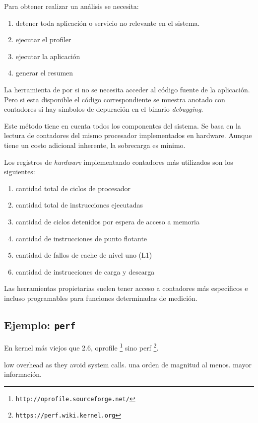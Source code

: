 \documentclass[a4paper]{report}
\begin{document}
Para obtener realizar un análisis se necesita:

\begin{enumerate}
\item detener toda aplicación o servicio no relevante en el sistema.
\item ejecutar el profiler
\item ejecutar la aplicación
\item generar el resumen
\end{enumerate}

La herramienta de por si no se necesita acceder al código fuente de la aplicación.
Pero si esta disponible el código correspondiente se muestra anotado con contadores
si hay símbolos de depuración en el binario {\it debugging}.

Este método tiene en cuenta todos los componentes del sistema.
Se basa en la lectura de contadores del mismo procesador implementados en hardware.
Aunque tiene un costo adicional inherente, la sobrecarga es mínimo.

Los registros de {\it hardware} implementando contadores más utilizados son los
siguientes:

\begin{enumerate}
\item cantidad total de ciclos de procesador
\item cantidad total de instrucciones ejecutadas
\item cantidad de ciclos detenidos por espera de acceso a memoria
\item cantidad de instrucciones de punto flotante
\item cantidad de fallos de cache de nivel uno (L1)
\item cantidad de instrucciones de carga y descarga
\end{enumerate}

Las herramientas propietarias suelen tener acceso a contadores más específicos e
incluso programables para funciones determinadas de medición.

\subsection{Ejemplo: {\tt perf}}

En kernel más viejos que 2.6, oprofile \footnote{\tt http://oprofile.sourceforge.net/} sino perf \footnote{\tt https://perf.wiki.kernel.org}.

low overhead as they avoid system calls. una orden de magnitud al menos. mayor información.
\end{document}

